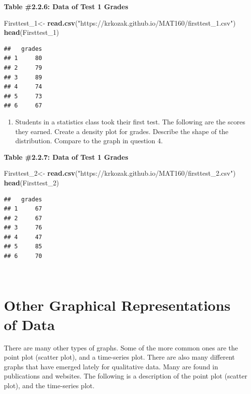 \documentclass[]{book}
\newenvironment{Shaded}{\begin{snugshade}}{\end{snugshade}}
\newcommand{\DecValTok}[1]{\textcolor[rgb]{0.00,0.00,0.81}{#1}}
\newcommand{\KeywordTok}[1]{\textcolor[rgb]{0.13,0.29,0.53}{\textbf{#1}}}
\newcommand{\NormalTok}[1]{#1}
\newcommand{\StringTok}[1]{\textcolor[rgb]{0.31,0.60,0.02}{#1}}
\providecommand{\tightlist}{%
  \setlength{\itemsep}{0pt}\setlength{\parskip}{0pt}}
\begin{document}
\textbf{Table \#2.2.6: Data of Test 1 Grades}

\begin{Shaded}
\begin{Highlighting}[]
\NormalTok{Firsttest_}\DecValTok{1}\NormalTok{<-}\StringTok{ }\KeywordTok{read.csv}\NormalTok{(}\StringTok{"https://krkozak.github.io/MAT160/firsttest_1.csv"}\NormalTok{)}
\KeywordTok{head}\NormalTok{(Firsttest_}\DecValTok{1}\NormalTok{)}
\end{Highlighting}
\end{Shaded}

\begin{verbatim}
##   grades
## 1     80
## 2     79
## 3     89
## 4     74
## 5     73
## 6     67
\end{verbatim}

\begin{enumerate}
\def\labelenumi{\arabic{enumi}.}
\setcounter{enumi}{4}
\tightlist
\item
  Students in a statistics class took their first test. The following are the scores they earned. Create a density plot for grades. Describe the shape of the distribution. Compare to the graph in question 4.
\end{enumerate}

\textbf{Table \#2.2.7: Data of Test 1 Grades}

\begin{Shaded}
\begin{Highlighting}[]
\NormalTok{Firsttest_}\DecValTok{2}\NormalTok{<-}\StringTok{ }\KeywordTok{read.csv}\NormalTok{(}\StringTok{"https://krkozak.github.io/MAT160/firsttest_2.csv"}\NormalTok{)}
\KeywordTok{head}\NormalTok{(Firsttest_}\DecValTok{2}\NormalTok{)}
\end{Highlighting}
\end{Shaded}

\begin{verbatim}
##   grades
## 1     67
## 2     67
## 3     76
## 4     47
## 5     85
## 6     70
\end{verbatim}

\emph{\\
}

\hypertarget{other-graphical-representations-of-data}{%
\section{Other Graphical Representations of Data}\label{other-graphical-representations-of-data}}

There are many other types of graphs. Some of the more common ones are the point plot (scatter plot), and a time-series plot. There are also many different graphs that have emerged lately for qualitative data. Many are found in publications and websites. The following is a description of the point plot (scatter plot), and the time-series plot.
\end{document}
